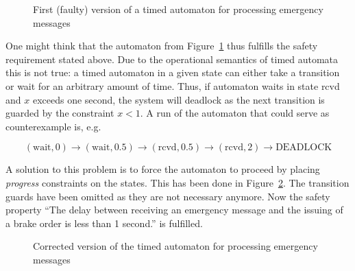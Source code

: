 \documentclass{template/openetcs_report}
\begin{document}
\begin{figure}
\begin{center}
\end{center}
\caption{First (faulty) version of a timed automaton for processing emergency messages}
\label{fig:ta:emergency1}
\end{figure}

One might think that the automaton from Figure~\ref{fig:ta:emergency1} thus fulfills the safety requirement stated above. Due to the operational semantics of timed automata this is not true: a timed automaton in a given state can either take a transition or wait for an arbitrary amount of time. Thus, if automaton waits in state rcvd and $x$ exceeds one second, the system will deadlock as the next transition is guarded by the constraint $x<1$. A run of the automaton that could serve as counterexample is, e.g.

$$(\mathrm{wait},0)\rightarrow(\mathrm{wait},0.5)\rightarrow(\mathrm{rcvd},0.5)\rightarrow(\mathrm{rcvd},2)\rightarrow\textrm{DEADLOCK}$$

A solution to this problem is to force the automaton to proceed by placing \emph{progress} constraints on the states. This has been done in Figure~\ref{fig:ta:emergency2}. The transition guards have been omitted as they are not necessary anymore. Now the safety property ``The delay between receiving an emergency message and the issuing of a brake order is less than 1 second.'' is fulfilled.

\begin{figure}
\begin{center}
\small
{}
\end{center}
\caption{Corrected version of the timed automaton for processing emergency messages}
\label{fig:ta:emergency2}
\end{figure}
\end{document}

